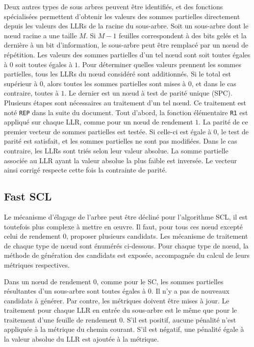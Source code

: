 Deux autres types de sous arbres peuvent être identifiés, et des fonctions spécialisées permettent d'obtenir les valeurs des sommes partielles directement depuis les valeurs des LLRs de la racine du sous-arbre. Soit un sous-arbre dont le nœud racine a une taille $M$. Si $M-1$ feuilles correspondent à des bits gelés et la dernière à un bit d'information, le sous-arbre peut être remplacé par un nœud de répétition. Les valeurs des sommes partielles d'un tel nœud sont soit toutes égales à $0$ soit toutes égales à $1$. Pour déterminer quelles valeurs prennent les sommes partielles, tous les LLRs du nœud considéré sont additionnés. Si le total est supérieur à 0, alors toutes les sommes partielles sont mises à $0$, et dans le cas contraire, toutes à $1$. Le dernier est un nœud à test de parité unique (SPC). Plusieurs étapes sont nécessaires au traitement d'un tel nœud. Ce traitement est noté \texttt{REP} dans la suite du document. Tout d'abord, la fonction élémentaire \texttt{R1} est appliqué sur chaque LLR, comme pour un nœud de rendement $1$. La parité de ce premier vecteur de sommes partielles est testée. Si celle-ci est égale à 0, le test de parité est satisfait, et les sommes partielles ne sont pas modifiées. Dans le cas contraire, les LLRs sont triés selon leur valeur absolue. La somme partielle associée au LLR ayant la valeur absolue la plus faible est inversée. Le vecteur ainsi corrigé respecte cette fois la contrainte de parité.

\subsection{Fast SCL}

Le mécanisme d'élagage de l'arbre peut être décliné pour l'algorithme SCL, il est toutefois plus complexe à mettre en œuvre. Il faut, pour tous ces nœud excepté celui de rendement 0, proposer plusieurs candidats. Les mécanisme de traitement de chaque type de nœud sont énumérés ci-dessous. Pour chaque type de nœud, la méthode de génération des candidats est exposée, accompagnée du calcul de leurs métriques respectives.

Dans un nœud de rendement 0, comme pour le SC, les sommes partielles résultantes d'un sous-arbre sont toutes égales à 0. Il n'y a pas de nouveaux candidats à générer. Par contre, les métriques doivent être mises à jour. Le traitement pour chaque LLR en entrée du sous-arbre est le même que pour le traitement d'une feuille de rendement 0. S'il est positif, aucune pénalité n'est appliquée à la métrique du chemin courant. S'il est négatif, une pénalité égale à la valeur absolue du LLR est ajoutée à la métrique. 

